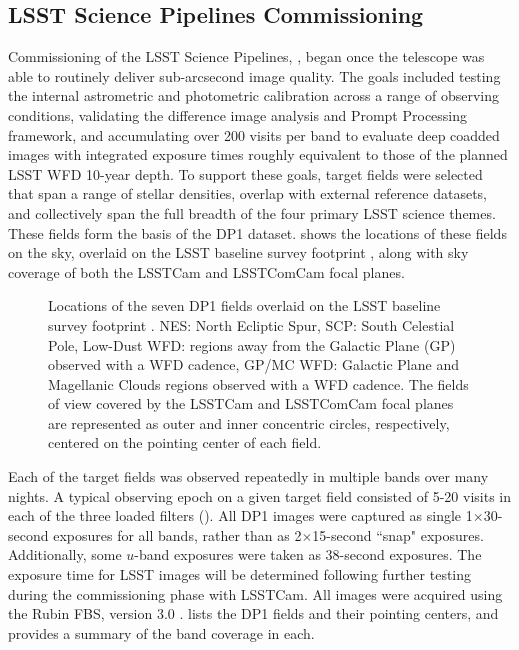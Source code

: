 \subsection{LSST Science Pipelines Commissioning}
\label{ssec:pipelines_commissioning}
Commissioning of the LSST Science Pipelines, \citep{PSTN-019},  began once the telescope was able to routinely deliver sub-arcsecond image quality.
The goals included testing the internal astrometric and photometric calibration across a range of observing conditions,
validating the difference image analysis and Prompt Processing \citep{dmtn-219} framework, and accumulating over 200 visits per band to evaluate
deep coadded images with integrated exposure times roughly equivalent to those of the planned LSST \gls{WFD} 10-year depth.
To support these goals, \nfields target fields were selected that span a range of stellar densities, overlap with external reference datasets, and collectively span the full breadth of the four primary \gls{LSST} science themes.
These \nfields fields form the basis of the \gls{DP1} dataset.
 shows the locations of these \nfields fields on the sky, overlaid on the LSST baseline survey footprint \citep{PSTN-051, PSTN-052, PSTN-053, PSTN-055, PSTN-056}, along with sky coverage of both the LSSTCam and \gls{LSSTComCam} focal planes.
\begin{figure}[bt!]
\centering
{}
\caption{Locations of the seven DP1 fields overlaid on the LSST baseline survey footprint \citep{PSTN-056}.
NES: North Ecliptic Spur, SCP: South Celestial Pole, Low-Dust WFD: regions away from the Galactic Plane (GP) observed with a WFD cadence, GP/MC WFD: Galactic Plane and Magellanic Clouds regions observed with a WFD cadence.
The fields of view covered by the LSSTCam and LSSTComCam focal planes are represented as outer and inner concentric circles, respectively, centered on the pointing center of each field.}
\label{fig:dp1_fields_on_sky}
\end{figure}


Each of the \nfields target fields was observed repeatedly in multiple bands over  many nights.
A typical observing \gls{epoch} on a given target field consisted of 5-20 visits in each of the three loaded filters ().
All DP1 images were captured as single 1$\times$30-second exposures for all bands, rather than as  2$\times$15-second ``snap" exposures.
Additionally, some $u$-band exposures were taken as 38-second exposures.
The  exposure time for LSST images will be determined following further testing during the commissioning phase with  LSSTCam.
All images were acquired using the Rubin \gls{FBS}, version 3.0 \citep{Naghib_2019, peter_yoachim_2024_13985198}.
 lists the \nfields \gls{DP1} fields and their pointing centers, and provides a summary of the band coverage in each.

